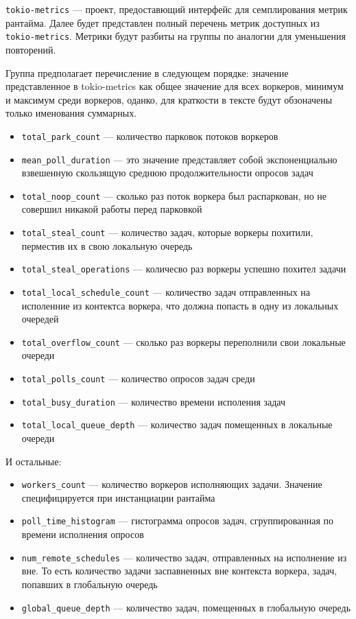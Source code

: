 \verb|tokio-metrics| --- проект, предоставющий интерфейс для семплирования метрик рантайма. Далее будет представлен полный перечень метрик доступных из \verb|tokio-metrics|. Метрики будут разбиты на группы по аналогии для уменьшения повторений.

Группа предполагает перечисление в следующем порядке: значение представленное в tokio-metrics как общее значение для всех воркеров, минимум и максимум среди воркеров, оданко, для краткости в тексте будут обзоначены только именования суммарных.

\begin{itemize}
    \item \verb|total_park_count| --- количество парковок потоков воркеров
    \item \verb|mean_poll_duration| --- это значение представляет собой экспоненциально взвешенную скользящую среднюю продолжительности опросов задач
    \item \verb|total_noop_count| --- сколько раз поток воркера был распаркован, но не совершил никакой работы перед парковкой
    \item \verb|total_steal_count| --- количество задач, которые воркеры похитили, перместив их в свою локальную очередь
    \item \verb|total_steal_operations| --- количесво раз воркеры успешно похител задачи
    \item \verb|total_local_schedule_count| --- количество задач отправленных на исполенние из контектса воркера, что должна попасть в одну из локальных очередей
    \item \verb|total_overflow_count| --- сколько раз воркеры переполнили свои локальные очереди
    \item \verb|total_polls_count| --- количество опросов задач среди
    \item \verb|total_busy_duration| --- количество времени исполения задач
    \item \verb|total_local_queue_depth| --- количество задач помещенных в локальные очереди
\end{itemize}

И остальные:

\begin{itemize}
    \item \verb|workers_count| --- количество воркеров исполняющих задачи. Значение специфицируется при инстанциации рантайма

    \item \verb|poll_time_histogram| --- гистограмма опросов задач, сгруппированная по времени исполнения опросов

    \item \verb|num_remote_schedules| --- количество задач, отправленных на исполнение из вне. То есть количество задачи заспавненных вне контекста воркера, задач, попавших в глобальную очередь

    \item \verb|global_queue_depth| --- количество задач, помещенных в глобальную очередь
\end{itemize}

